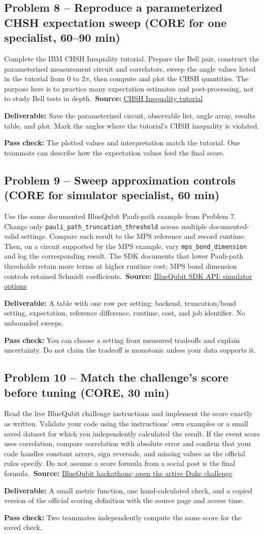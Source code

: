 \documentclass[11pt,letterpaper]{article}
\newcommand{\taskbox}[1]{\vspace{2pt}\noindent\colorbox{pale}{\parbox{\dimexpr\linewidth-2\fboxsep}{\textcolor{ink}{\textbf{Deliverable:} #1}}}\vspace{3pt}}
\newcommand{\pass}[1]{\textbf{Pass check:} #1}
\newcommand{\source}[2]{\textbf{Source:} \href{#1}{#2}}
\begin{document}
\subsection*{Problem 8 -- Reproduce a parameterized CHSH expectation sweep (CORE for one specialist, 60--90 min)}
Complete the IBM CHSH Inequality tutorial. Prepare the Bell pair, construct the parameterized measurement circuit and correlators, sweep the angle values listed in the tutorial from \(0\) to \(2\pi\), then compute and plot the CHSH quantities. The purpose here is to practice many expectation estimates and post-processing, not to study Bell tests in depth.\
\source{https://learning.quantum.ibm.com/tutorial/chsh-inequality}{CHSH Inequality tutorial}
\taskbox{Save the parameterized circuit, observable list, angle array, results table, and plot. Mark the angles where the tutorial's CHSH inequality is violated.}
\pass{The plotted values and interpretation match the tutorial. One teammate can describe how the expectation values feed the final score.}

\subsection*{Problem 9 -- Sweep approximation controls (CORE for simulator specialist, 60 min)}
Use the same documented BlueQubit Pauli-path example from Problem 7. Change only \texttt{pauli\_path\_truncation\_threshold} across multiple documented-valid settings. Compare each result to the MPS reference and record runtime. Then, on a circuit supported by the MPS example, vary \texttt{mps\_bond\_dimension} and log the corresponding result. The SDK documents that lower Pauli-path thresholds retain more terms at higher runtime cost; MPS bond dimension controls retained Schmidt coefficients.\
\source{https://app.bluequbit.io/sdk-docs/bluequbit.sdk.html}{BlueQubit SDK API: simulator options}
\taskbox{A table with one row per setting: backend, truncation/bond setting, expectation, reference difference, runtime, cost, and job identifier. No unbounded sweeps.}
\pass{You can choose a setting from measured tradeoffs and explain uncertainty. Do not claim the tradeoff is monotonic unless your data supports it.}

\subsection*{Problem 10 -- Match the challenge's score before tuning (CORE, 30 min)}
Read the live BlueQubit challenge instructions and implement the score exactly as written. Validate your code using the instructions' own examples or a small saved dataset for which you independently calculated the result. If the event score uses correlation, compare correlation with absolute error and confirm that your code handles constant arrays, sign reversals, and missing values as the official rules specify. Do not assume a score formula from a social post is the final formula.\
\source{https://app.bluequbit.io/hackathons}{BlueQubit hackathons; open the active Duke challenge}
\taskbox{A small metric function, one hand-calculated check, and a copied version of the official scoring definition with the source page and access time.}
\pass{Two teammates independently compute the same score for the saved check.}
\end{document}
